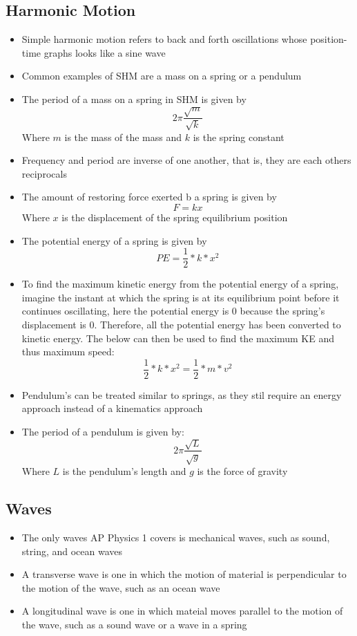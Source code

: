 \subsection{Harmonic Motion}
\begin{itemize}
    \item Simple harmonic motion refers to back and forth oscillations whose position-time graphs looks like a sine wave
    \item Common examples of SHM are a mass on a spring or a pendulum
    \item The period of a mass on a spring in SHM is given by \[2\pi\frac{\sqrt{m}}{\sqrt{k}}\]
    Where \(m\) is the mass of the mass and \(k\) is the spring constant
    \item Frequency and period are inverse of one another, that is, they are each others reciprocals
    \item The amount of restoring force exerted b a spring is given by \[F=kx\] Where \(x\) is the displacement of the spring equilibrium position
    \item The potential energy of a spring is given by \[PE=\frac{1}{2}*k*x^2\]
    \item To find the maximum kinetic energy from the potential energy of a spring, imagine the instant at which the spring is at its equilibrium point before it continues oscillating, here the potential energy is 0 because the spring's displacement is 0. Therefore, all the potential energy has been converted to kinetic energy. The below can then be used to find the maximum KE and thus maximum speed: \[\frac{1}{2}*k*x^2=\frac{1}{2}*m*v^2\]
    \item Pendulum's can be treated similar to springs, as they stil require an energy approach instead of a kinematics approach
    \item The period of a pendulum is given by: \[2\pi\frac{\sqrt{L}}{\sqrt{g}}\] Where \(L\) is the pendulum's length and \(g\) is the force of gravity
\end{itemize}

\subsection{Waves}
\begin{itemize}
    \item The only waves AP Physics 1 covers is mechanical waves, such as sound, string, and ocean waves
    \item A transverse wave is one in which the motion of material is perpendicular to the motion of the wave, such as an ocean wave
    \item A longitudinal wave is one in which mateial moves parallel to the motion of the wave, such as a sound wave or a wave in a spring
\end{itemize}

